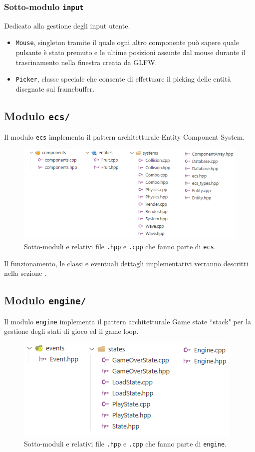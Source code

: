 \subsubsection{Sotto-modulo \texttt{input}}
Dedicato alla gestione degli input utente. 
\begin{itemize}
	\item \texttt{Mouse}, singleton tramite il quale ogni altro componente può sapere quale pulsante è stato premuto e le ultime posizioni assunte dal mouse durante il trascinamento nella finestra creata da GLFW.
	\item \texttt{Picker}, classe speciale che consente di effettuare il picking delle entità disegnate sul framebuffer.
\end{itemize}


\subsection{Modulo \texttt{ecs/}}
Il modulo \texttt{ecs} implementa il pattern architetturale Entity Component System.

\begin{figure}[!hpt]
	\centering
	\includegraphics[width=0.95\linewidth]{images/ch20/3}
	\caption{Sotto-moduli e relativi file \texttt{.hpp} e \texttt{.cpp} che fanno parte di \texttt{ecs}.}
	\label{fig:module-ecs}
\end{figure}

Il funzionamento, le classi e eventuali dettagli implementativi verranno descritti nella sezione .


\subsection{Modulo \texttt{engine/}}
Il modulo \texttt{engine} implementa il pattern architetturale Game state ``stack" per la gestione degli stati di gioco ed il game loop.

\begin{figure}[!hpt]
	\centering
	\includegraphics[width=0.8\linewidth]{images/ch20/4}
	\caption{Sotto-moduli e relativi file \texttt{.hpp} e \texttt{.cpp} che fanno parte di \texttt{engine}.}
	\label{fig:module-engine}
\end{figure}

